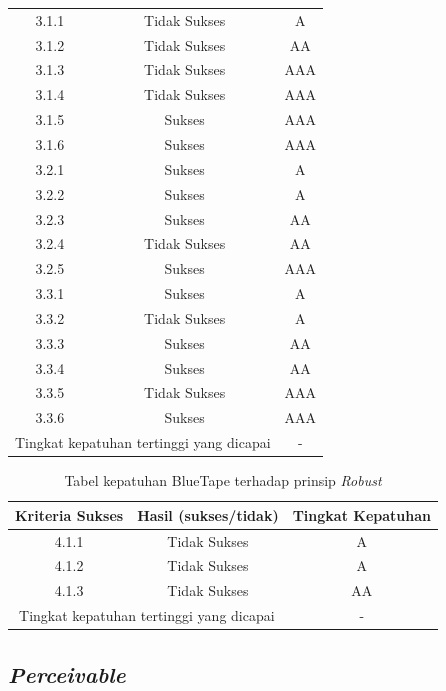 \documentclass[a4paper,twoside]{article}
\begin{document}
\begin{enumerate}
\begin{table}[H]
\begin{tabular}{|c|c|c|}
				\midrule
				3.1.1 & Tidak Sukses & A \\
				3.1.2 & Tidak Sukses & AA \\
				3.1.3 & Tidak Sukses & AAA \\
				3.1.4 & Tidak Sukses & AAA \\
				3.1.5 & Sukses & AAA \\
				3.1.6 & Sukses & AAA \\
				3.2.1 & Sukses & A \\
				3.2.2 & Sukses & A \\
				3.2.3 & Sukses & AA \\
				3.2.4 & Tidak Sukses & AA \\
				3.2.5 & Sukses & AAA \\
				3.3.1 & Sukses & A \\
				3.3.2 & Tidak Sukses & A \\
				3.3.3 & Sukses & AA \\
				3.3.4 & Sukses & AA \\
				3.3.5 & Tidak Sukses & AAA \\
				3.3.6 & Sukses & AAA \\

				\bottomrule
				\multicolumn{2}{|c|}{Tingkat kepatuhan tertinggi yang dicapai} & - \\
				\bottomrule

			\end{tabular}
		\end{table}
		\begin{table}[H]
			\centering 
			\caption{Tabel kepatuhan BlueTape terhadap prinsip \textit{Robust}}
			\label{tab:kepatuhan_bluetape_robust}
			\begin{tabular}{|c|c|c|}
				\toprule
				Kriteria Sukses & Hasil (sukses/tidak) & Tingkat Kepatuhan\\

				\midrule
				4.1.1 & Tidak Sukses & A \\
				4.1.2 & Tidak Sukses & A \\
				4.1.3 & Tidak Sukses & AA \\

				\bottomrule
				\multicolumn{2}{|c|}{Tingkat kepatuhan tertinggi yang dicapai} & - \\
				\bottomrule

			\end{tabular} 
		\end{table}

		\subsection*{\textit{Perceivable}}
		\label{subsec:kepatuhan_bluetape_perceivable}


\end{enumerate}
\end{document}
